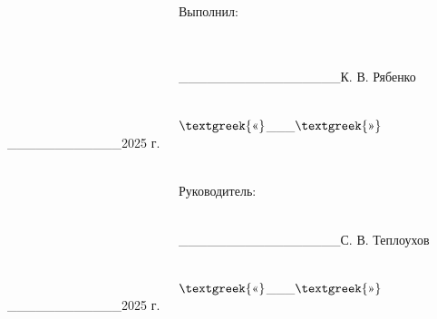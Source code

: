 \documentclass[a4paper]{article}
\begin{document}
{
\ \ \ \ \ \ \ \ \ \ \ \ \ \ \ \ \ \ \ \ \ \ \ \ \ \ \ \ \ \ \ \ \ \ \ \ \ \ \ \ \ \ \ \ \ \ \ \ \ \ \ \ \ \ \ \ \ \ \ \ \ \ \ \ \ \ \ \ \ \ \ \ \ \ \ \ \ \ \ \ \ \ \ \ \ \ \ \ \ \ \ \ \ \ \ \ \ \ \ Выполнил:
\ \ \ \ \ \ \ \ \ \ \ \ \ \ \ \ \ \ \ \ \ \ \ \ \ \ \ \ \ \ \ \ \ \ \ \ \ }

{
\ \ \ \ \ \ \ \ \ \ \ \ \ \ \ \ \ \ \ \ \ \ \ \ \ \ \ \ \ \ \ \ \ \ \ \ \ \ \ \ \ \ \ \ \ \ \ \ \ \ \ \ \ \ \ \ \ \ \ \ \ \ \ \ \ \ \ \ \ \ \ \ \ \ \ \ \ \ \ \ \ \ \ \ \ \ \ \ \ \ \ \ \ \ \ \ \ \ \ \_\_\_\_\_\_\_\_\_\_\_\_\_\_\_\_\_К.
В. Рябенко }

{
\ \ \ \ \ \ \ \ \ \ \ \ \ \ \ \ \ \ \ \ \ \ \ \ \ \ \ \ \ \ \ \ \ \ \ \ \ \ \ \ \ \ \ \ \ \ \ \ \ \ \ \ \ \ \ \ \ \ \ \ \ \ \ \ \ \ \ \ \ \ \ \ \ \ \ \ \ \ \ \ \ \ \ \ \ \ \ \ \ \ \ \ \ \ \ \ \ \ \ $\text{\textgreek{«}}$\_\_\_$\text{\textgreek{»}}$\_\_\_\_\_\_\_\_\_\_\_\_2025
г. \ \ \ \ \ \ \ \ \ \ \ }


\bigskip


\bigskip

{
\ \ \ \ \ \ \ \ \ \ \ \ \ \ \ \ \ \ \ \ \ \ \ \ \ \ \ \ \ \ \ \ \ \ \ \ \ \ \ \ \ \ \ \ \ \ \ \ \ \ \ \ \ \ \ \ \ \ \ \ \ \ \ \ \ \ \ \ \ \ \ \ \ \ \ \ \ \ \ \ \ \ \ \ \ \ \ \ \ \ \ \ \ \ \ \ \ \ \ Руководитель:
\ \ \ \ \ \ \ \ \ \ \ \ \ \ \ \ \ \ \ \ \ \ \ \ \ \ \ \ \ \ \ }

{
\ \ \ \ \ \ \ \ \ \ \ \ \ \ \ \ \ \ \ \ \ \ \ \ \ \ \ \ \ \ \ \ \ \ \ \ \ \ \ \ \ \ \ \ \ \ \ \ \ \ \ \ \ \ \ \ \ \ \ \ \ \ \ \ \ \ \ \ \ \ \ \ \ \ \ \ \ \ \ \ \ \ \ \ \ \ \ \ \ \ \ \ \ \ \ \ \ \ \ \_\_\_\_\_\_\_\_\_\_\_\_\_\_\_\_\_С.
В. Теплоухов}

{
\ \ \ \ \ \ \ \ \ \ \ \ \ \ \ \ \ \ \ \ \ \ \ \ \ \ \ \ \ \ \ \ \ \ \ \ \ \ \ \ \ \ \ \ \ \ \ \ \ \ \ \ \ \ \ \ \ \ \ \ \ \ \ \ \ \ \ \ \ \ \ \ \ \ \ \ \ \ \ \ \ \ \ \ \ \ \ \ \ \ \ \ \ \ \ \ \ \ \ $\text{\textgreek{«}}$\_\_\_$\text{\textgreek{»}}$\_\_\_\_\_\_\_\_\_\_\_\_2025
г. \ \ \ \ \ \ \ \ \ \ \ \ \ \ \ }


\bigskip


\bigskip


\bigskip


\bigskip


\bigskip


\bigskip


\bigskip


\bigskip


\bigskip
\end{document}
